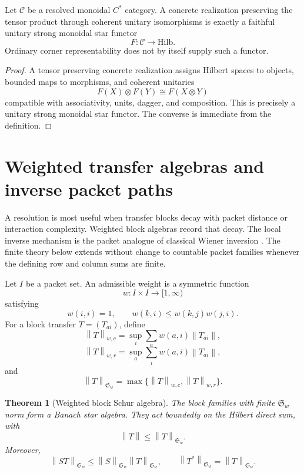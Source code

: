 \documentclass{aomart}
\newtheorem{theorem}{Theorem}[section]
\theoremstyle{definition}
\theoremstyle{remark}
\newcommand{\Ccal}{\mathcal C}
\newcommand{\norm}[1]{\left\lVert#1\right\rVert}
\newcommand{\Rcite}[1]{\cite{#1}}
\begin{document}
\begin{proposition}\label{prop:monoidal_boundary}
Let \(\Ccal\) be a resolved monoidal \(C^*\) category. A concrete realization preserving the tensor product through coherent unitary isomorphisms is exactly a faithful unitary strong monoidal star functor
\[
 F:\Ccal\longrightarrow\mathrm{Hilb}.
\]
Ordinary corner representability does not by itself supply such a functor.
\end{proposition}

\begin{proof}
A tensor preserving concrete realization assigns Hilbert spaces to objects, bounded maps to morphisms, and coherent unitaries
\[
 F(X)\otimes F(Y)\cong F(X\otimes Y)
\]
compatible with associativity, units, dagger, and composition. This is precisely a unitary strong monoidal star functor. The converse is immediate from the definition.
\end{proof}

\section{Weighted transfer algebras and inverse packet paths}\label{sec:weighted_inverse}

A resolution is most useful when transfer blocks decay with packet distance or interaction complexity. Weighted block algebras record that decay. The local inverse mechanism is the packet analogue of classical Wiener inversion \Rcite{R18}. The finite theory below extends without change to countable packet families whenever the defining row and column sums are finite.

\begin{definition}\label{def:admissible_weight}
Let \(I\) be a packet set. An admissible weight is a symmetric function
\[
 w:I\times I\longrightarrow[1,\infty)
\]
satisfying
\[
 w(i,i)=1,
 \qquad
 w(k,i)\leq w(k,j)w(j,i).
\]
For a block transfer \(T=(T_{ai})\), define
\[
 \norm T_{w,c}
 =
 \sup_i\sum_a w(a,i)\norm{T_{ai}},
\]
\[
 \norm T_{w,r}
 =
 \sup_a\sum_i w(a,i)\norm{T_{ai}},
\]
and
\[
 \norm T_{\mathfrak S_w}
 =
 \max\{\norm T_{w,c},\norm T_{w,r}\}.
\]
\end{definition}

\begin{theorem}[Weighted block Schur algebra]\label{thm:weighted_schur_algebra}
The block families with finite \(\mathfrak S_w\) norm form a Banach star algebra. They act boundedly on the Hilbert direct sum, with
\[
 \boxed{
 \norm T\leq\norm T_{\mathfrak S_w}.
 }
\]
Moreover,
\[
 \boxed{
 \norm{ST}_{\mathfrak S_w}
 \leq
 \norm S_{\mathfrak S_w}\norm T_{\mathfrak S_w},
 \qquad
 \norm{T^*}_{\mathfrak S_w}=\norm T_{\mathfrak S_w}.
 }
\]
\end{theorem}
\end{document}
